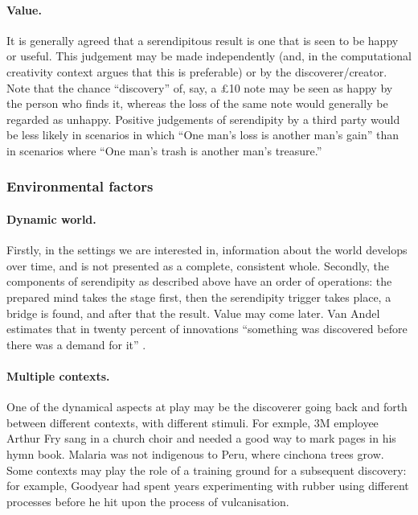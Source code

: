 \documentclass{llncs}
\begin{document}
\paragraph{Value.}

It is generally agreed that a serendipitous result is one that is seen
to be happy or useful.
%
This judgement may be made independently (and, in the computational
creativity context \cite{jordanous:12} argues that this is
preferable) or by the discoverer/creator.  Note that the chance
``discovery'' of, say, a \pounds 10 note may be seen as happy by the
person who finds it, whereas the loss of the same note would generally
be regarded as unhappy.  Positive judgements of serendipity by a third
party would be less likely in scenarios in which ``One man's loss is
another man's gain'' than in scenarios where ``One man's trash is
another man's treasure.''

\newpage
\subsubsection*{Environmental factors}

\paragraph{Dynamic world.}

Firstly, in the settings we are interested in, information about the
world develops over time, and is not presented as a complete,
consistent whole.
%
Secondly, the components of serendipity as described above have an
order of operations: the prepared mind takes the stage first, then the
serendipity trigger takes place, a bridge is found, and after that the
result.  Value may come later.  Van Andel estimates that in twenty
percent of innovations ``something was discovered before there
  was a demand for it'' \cite[p. 643]{van1994anatomy}.

\paragraph{Multiple contexts.}

One of the dynamical aspects at play may be the discoverer going back
and forth between different contexts, with different stimuli.
%
For exmple, 3M employee Arthur Fry sang in a church choir and needed a
good way to mark pages in his hymn book.  Malaria was not indigenous
to Peru, where cinchona trees grow.  Some contexts may play the role
of a training ground for a subsequent discovery: for example, Goodyear
had spent years experimenting with rubber using different processes
before he hit upon the process of vulcanisation.
\end{document}
